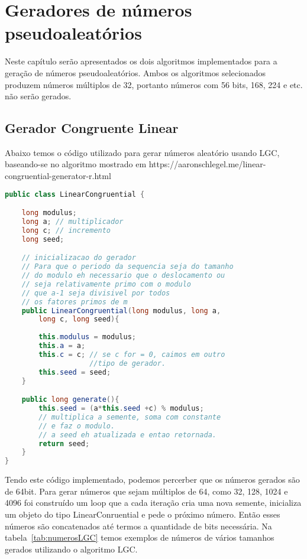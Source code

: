 \documentclass[openany]{ufsctex/ufsctex}
\begin{document}
    \folhaderosto
    \sumario
    
    \chapter{Geradores de números pseudoaleatórios}
    Neste capítulo serão apresentados os dois algoritmos implementados para a geração de números pseudoaleatórios. Ambos os algoritmos selecionados produzem números múltiplos de 32, portanto números com 56 bits, 168, 224 e etc. não serão gerados.
    
    \section{Gerador Congruente Linear}
    Abaixo temos o código utilizado para gerar números aleatório usando LGC, baseando-se no algoritmo mostrado em https://aaronschlegel.me/linear-congruential-generator-r.html 
     \begin{lstlisting}[language=Java,breaklines=true, tabsize=2,basicstyle =\fontsize{9}{11}]
public class LinearCongruential {

    long modulus;
    long a; // multiplicador
    long c; // incremento
    long seed;

    // inicializacao do gerador
    // Para que o periodo da sequencia seja do tamanho 
    // do modulo eh necessario que o deslocamento ou
    // seja relativamente primo com o modulo
    // que a-1 seja divisivel por todos 
    // os fatores primos de m
    public LinearCongruential(long modulus, long a, 
    	long c, long seed){
    	
        this.modulus = modulus;
        this.a = a;
        this.c = c; // se c for = 0, caimos em outro 
        			//tipo de gerador.
        this.seed = seed;
    }

    public long generate(){
        this.seed = (a*this.seed +c) % modulus;
        // multiplica a semente, soma com constante 
        // e faz o modulo.
        // a seed eh atualizada e entao retornada.
        return seed; 
    }
}
\end{lstlisting}
	Tendo este código implementado, podemos percerber que os números gerados são de 64bit. Para gerar números que sejam múltiplos de 64, como 32, 128, 1024 e 4096 foi construído um loop que a cada iteração cria uma nova semente, inicializa um objeto do tipo LinearConruential e pede o próximo número. Então esses números são concatenados até termos a quantidade de bits necessária. Na tabela~\ref{tab:numerosLGC} temos exemplos de números de vários tamanhos gerados utilizando o algoritmo LGC.
	
\end{document}
